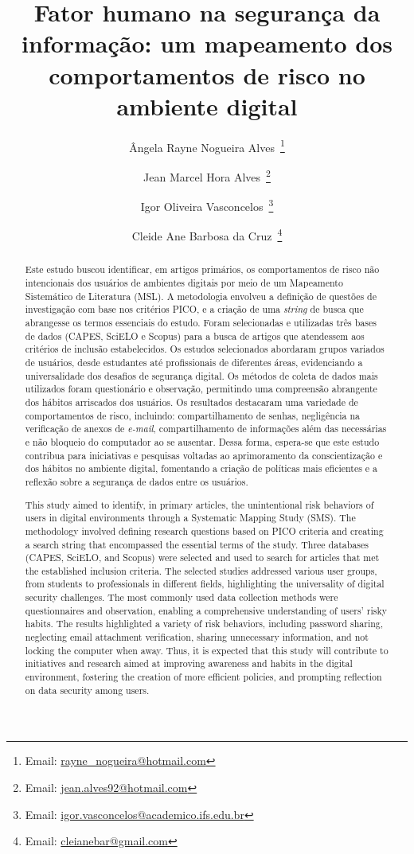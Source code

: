 \documentclass[portuguese]{textolivre}
\title{Fator humano na segurança da informação: um mapeamento dos comportamentos de risco no ambiente digital}
\author[1]{Ângela Rayne Nogueira Alves~\orcid{0009-0009-7929-7559}\thanks{Email: \href{mailto:rayne\_nogueira@hotmail.com}{rayne\_nogueira@hotmail.com}}}
\author[1]{Jean Marcel Hora Alves~\orcid{0009-0007-1766-7185}\thanks{Email: \href{mailto:jean.alves92@hotmail.com}{jean.alves92@hotmail.com}}}
\author[1]{Igor Oliveira Vasconcelos~\orcid{0000-0001-6497-1007}\thanks{Email: \href{mailto:igor.vasconcelos@academico.ifs.edu.br}{igor.vasconcelos@academico.ifs.edu.br}}}
\author[2]{Cleide Ane Barbosa da Cruz~\orcid{0000-0002-8277-1460}\thanks{Email: \href{mailto:cleianebar@gmail.com}{cleianebar@gmail.com}}}
\affil[1]{Instituto Federal de Educação, Ciência e Tecnologia de Sergipe, Propriá, SE, Brasil.}
\affil[2]{Centro Universitário Estácio de Sergipe/ Instituto Federal de Educação, Ciência e Tecnologia de Sergipe, SE, Brasil.}
\begin{document}
\maketitle
\begin{polyabstract}
\begin{abstract}
Este estudo buscou identificar, em artigos primários, os comportamentos de risco não intencionais dos usuários de ambientes digitais por meio de um Mapeamento Sistemático de Literatura (MSL). A metodologia envolveu a definição de questões de investigação com base nos critérios PICO, e a criação de uma \textit{string} de busca que abrangesse os termos essenciais do estudo. Foram selecionadas e utilizadas três bases de dados (CAPES, SciELO e Scopus) para a busca de artigos que atendessem aos critérios de inclusão estabelecidos. Os estudos selecionados abordaram grupos variados de usuários, desde estudantes até profissionais de diferentes áreas, evidenciando a universalidade dos desafios de segurança digital. Os métodos de coleta de dados mais utilizados foram questionário e observação, permitindo uma compreensão abrangente dos hábitos arriscados dos usuários. Os resultados destacaram uma variedade de comportamentos de risco, incluindo: compartilhamento de senhas, negligência na verificação de anexos de \textit{e-mail}, compartilhamento de informações além das necessárias e não bloqueio do computador ao se ausentar. Dessa forma, espera-se que este estudo contribua para iniciativas e pesquisas voltadas ao aprimoramento da conscientização e dos hábitos no ambiente digital, fomentando a criação de políticas mais eficientes e a reflexão sobre a segurança de dados entre os usuários.

\end{abstract}

\begin{english}
\begin{abstract}
This study aimed to identify, in primary articles, the unintentional risk behaviors of users in digital environments through a Systematic Mapping Study (SMS). The methodology involved defining research questions based on PICO criteria and creating a search string that encompassed the essential terms of the study. Three databases (CAPES, SciELO, and Scopus) were selected and used to search for articles that met the established inclusion criteria. The selected studies addressed various user groups, from students to professionals in different fields, highlighting the universality of digital security challenges. The most commonly used data collection methods were questionnaires and observation, enabling a comprehensive understanding of users' risky habits. The results highlighted a variety of risk behaviors, including password sharing, neglecting email attachment verification, sharing unnecessary information, and not locking the computer when away. Thus, it is expected that this study will contribute to initiatives and research aimed at improving awareness and habits in the digital environment, fostering the creation of more efficient policies, and prompting reflection on data security among users.


\end{abstract}
\end{english}
\end{polyabstract}
\end{document}
